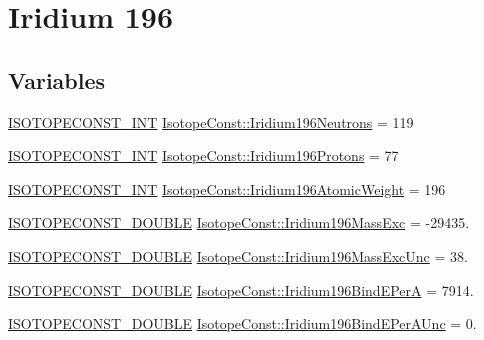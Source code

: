 \hypertarget{group___isotope_const-_iridium-_ir196}{}\section{Iridium 196}
\label{group___isotope_const-_iridium-_ir196}
\subsection*{Variables}
\begin{DoxyCompactItemize}
\item 
\mbox{\hyperlink{group___isotope_const-_macros_ga5f18360b3e99483a35c32d789e62621c}{I\+S\+O\+T\+O\+P\+E\+C\+O\+N\+S\+T\+\_\+\+I\+NT}} \mbox{\hyperlink{group___isotope_const-_iridium-_ir196_gabce95a2c8401a70215888e587e6b3fd1}{Isotope\+Const\+::\+Iridium196\+Neutrons}} = 119
\item 
\mbox{\hyperlink{group___isotope_const-_macros_ga5f18360b3e99483a35c32d789e62621c}{I\+S\+O\+T\+O\+P\+E\+C\+O\+N\+S\+T\+\_\+\+I\+NT}} \mbox{\hyperlink{group___isotope_const-_iridium-_ir196_ga3581064028f529ee79ed9ad60b09abc4}{Isotope\+Const\+::\+Iridium196\+Protons}} = 77
\item 
\mbox{\hyperlink{group___isotope_const-_macros_ga5f18360b3e99483a35c32d789e62621c}{I\+S\+O\+T\+O\+P\+E\+C\+O\+N\+S\+T\+\_\+\+I\+NT}} \mbox{\hyperlink{group___isotope_const-_iridium-_ir196_ga41d4b0502f79d229faaddde0dedd9e88}{Isotope\+Const\+::\+Iridium196\+Atomic\+Weight}} = 196
\item 
\mbox{\hyperlink{group___isotope_const-_macros_ga8f45a7272ce02c0b4c65c44636ed719a}{I\+S\+O\+T\+O\+P\+E\+C\+O\+N\+S\+T\+\_\+\+D\+O\+U\+B\+LE}} \mbox{\hyperlink{group___isotope_const-_iridium-_ir196_ga9903844f843527422af04729a468688c}{Isotope\+Const\+::\+Iridium196\+Mass\+Exc}} = -\/29435.
\item 
\mbox{\hyperlink{group___isotope_const-_macros_ga8f45a7272ce02c0b4c65c44636ed719a}{I\+S\+O\+T\+O\+P\+E\+C\+O\+N\+S\+T\+\_\+\+D\+O\+U\+B\+LE}} \mbox{\hyperlink{group___isotope_const-_iridium-_ir196_ga24c54c6c6e7bd4503121319dd372bba8}{Isotope\+Const\+::\+Iridium196\+Mass\+Exc\+Unc}} = 38.
\item 
\mbox{\hyperlink{group___isotope_const-_macros_ga8f45a7272ce02c0b4c65c44636ed719a}{I\+S\+O\+T\+O\+P\+E\+C\+O\+N\+S\+T\+\_\+\+D\+O\+U\+B\+LE}} \mbox{\hyperlink{group___isotope_const-_iridium-_ir196_ga0f96c3753d364c397e3c19b0ca0b58b2}{Isotope\+Const\+::\+Iridium196\+Bind\+E\+PerA}} = 7914.
\item 
\mbox{\hyperlink{group___isotope_const-_macros_ga8f45a7272ce02c0b4c65c44636ed719a}{I\+S\+O\+T\+O\+P\+E\+C\+O\+N\+S\+T\+\_\+\+D\+O\+U\+B\+LE}} \mbox{\hyperlink{group___isotope_const-_iridium-_ir196_ga91ed011dd47394a3079f2e8b7025c5dc}{Isotope\+Const\+::\+Iridium196\+Bind\+E\+Per\+A\+Unc}} = 0.

\end{DoxyCompactItemize}
